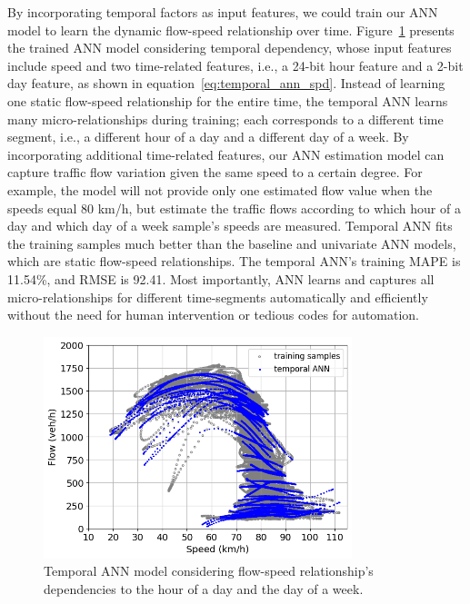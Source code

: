 \documentclass[english]{kththesis}
\begin{document}
By incorporating temporal factors as input features, we could train our ANN model to learn the dynamic flow-speed relationship over time. Figure~\ref{fig:temporal_ann_training} presents the trained ANN model considering temporal dependency, whose input features include speed and two time-related features, i.e., a 24-bit hour feature and a 2-bit day feature, as shown in equation~\ref{eq:temporal_ann_spd}. Instead of learning one static flow-speed relationship for the entire time, the temporal ANN learns many micro-relationships during training; each corresponds to a different time segment, i.e., a different hour of a day and a different day of a week. By incorporating additional time-related features, our ANN estimation model can capture traffic flow variation given the same speed to a certain degree. For example, the model will not provide only one estimated flow value when the speeds equal 80 km/h, but estimate the traffic flows according to which hour of a day and which day of a week sample's speeds are measured. Temporal ANN fits the training samples much better than the baseline and univariate ANN models, which are static flow-speed relationships. The temporal ANN's training MAPE is 11.54\%, and RMSE is 92.41. Most importantly, ANN learns and captures all micro-relationships for different time-segments automatically and efficiently without the need for human intervention or tedious codes for automation.

\begin{figure}[!ht]
    \centering
    \includegraphics[width=0.8\textwidth]{temporal_ann_training.png}    \caption{Temporal ANN model considering flow-speed relationship's dependencies to the hour of a day and the day of a week.}
    \label{fig:temporal_ann_training}
\end{figure}
\end{document}
